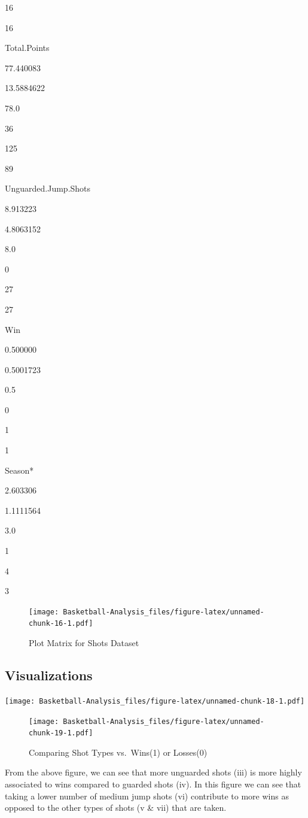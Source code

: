 \documentclass[]{book}
\begin{document}
16

16

Total.Points

77.440083

13.5884622

78.0

36

125

89

Unguarded.Jump.Shots

8.913223

4.8063152

8.0

0

27

27

Win

0.500000

0.5001723

0.5

0

1

1

Season*

2.603306

1.1111564

3.0

1

4

3

\begin{figure}
\centering
\texttt{[image: Basketball-Analysis\_files/figure-latex/unnamed-chunk-16-1.pdf]}
\caption{\label{fig:unnamed-chunk-16}Plot Matrix for Shots Dataset}
\end{figure}

\hypertarget{visualizations}{%
\subsection{Visualizations}\label{visualizations}}

\texttt{[image: Basketball-Analysis\_files/figure-latex/unnamed-chunk-18-1.pdf]}

\begin{figure}
\centering
\texttt{[image: Basketball-Analysis\_files/figure-latex/unnamed-chunk-19-1.pdf]}
\caption{\label{fig:unnamed-chunk-19}Comparing Shot Types vs.~Wins(1) or Losses(0)}
\end{figure}

From the above figure, we can see that more unguarded shots (iii) is more highly associated to wins compared to guarded shots (iv).
In this figure we can see that taking a lower number of medium jump shots (vi) contribute to more wins as opposed to the other types of shots (v \& vii) that are taken.
\end{document}
